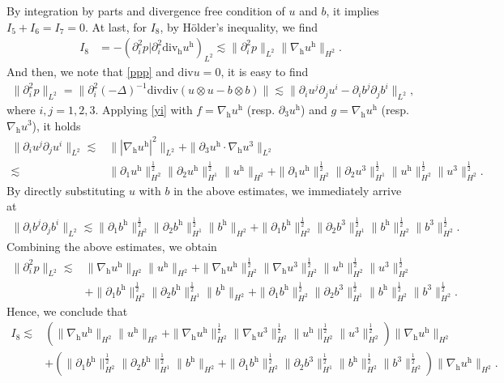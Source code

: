 \documentclass[11pt]{amsart}
\theoremstyle{definition}
\newcommand{\h}{\mathrm{h}}
\newcommand{\nablah}{\nabla_{\mathrm{h}}}
\numberwithin{equation}{section}
\begin{document}
By integration by parts and divergence free condition of $u$ and $b$, it implies $I_{5}+I_{6}=I_{7}=0$. At last, for $I_{8}$, by H\"older's inequality, we find
\begin{align*}
	I_{8}&=-
	\left(\partial_{i}^2p|\partial_{i}^2\mathrm{div}_\h u^\h\right)_{L^2}\lesssim\|\partial_{i}^2p\|_{L^2}\|\nabla_{\mathrm{h}}u^\mathrm{h}\|_{H^{2}}.
\end{align*}
And then, we note that \eqref{ppp}
and  $\mathrm{div}u=0$, it is easy to find
\begin{align*}
	\|\partial_{i}^2p\|_{L^2}=\|\partial_{i}^2(-\Delta)^{-1}\mathrm{divdiv}(u\otimes u-b\otimes b)\|\lesssim\|\partial_iu^j\partial_ju^i-\partial_ib^j\partial_jb^i\|_{L^2},
\end{align*}
where $i,j=1,2,3$. Applying \eqref{yi} with $f=\nablah u^\h$ (resp. $\partial_3 u^\h$) and $g=\nablah u^\h$ (resp. $\nablah u^3$), it holds
\begin{align*}
	\|\partial_iu^j\partial_ju^i\|_{L^2}\lesssim&\||\nablah u^\h|^2\|_{L^2}+\|\partial_3u^\h\cdot\nablah u^3\|_{L^2}\\
	\lesssim&\|\partial_1u^\h\|_{H^2}^\frac12\|\partial_2u^\h\|_{H^1}^\frac12\|u^\h\|_{H^2}+\|\partial_1u^\h\|_{H^2}^\frac12\|\partial_2u^3\|_{H^1}^\frac12\|u^\h\|_{H^2}^\frac12\|u^3\|_{H^2}^\frac12.
\end{align*}
By directly substituting $u$ with $b$ in the above estimates, we immediately arrive at
\begin{align*}
	\|\partial_ib^j\partial_jb^i\|_{L^2}\lesssim\|\partial_1b^\h\|_{H^2}^\frac12\|\partial_2b^\h\|_{H^1}^\frac12\|b^\h\|_{H^2}+\|\partial_1b^\h\|_{H^2}^\frac12\|\partial_2b^3\|_{H^1}^\frac12\|b^\h\|_{H^2}^\frac12\|b^3\|_{H^2}^\frac12.
\end{align*}
Combining the above estimates, we obtain
\begin{align}\label{P_H2}
	\|\partial_{i}^2p\|_{L^2}\lesssim&\|\nablah u^\h\|_{H^2}\|u^\h\|_{H^2}+ \|\nablah u^\h\|_{H^2}^\frac12\|\nablah u^3\|_{H^2}^\frac12\|u^\h\|_{H^2}^\frac12\|u^3\|_{H^2}^\frac12 \nonumber\\
	&+\|\partial_1b^\h\|_{H^2}^\frac12\|\partial_2b^\h\|_{H^1}^\frac12\|b^\h\|_{H^2}+\|\partial_1b^\h\|_{H^2}^\frac12\|\partial_2b^3\|_{H^1}^\frac12\|b^\h\|_{H^2}^\frac12\|b^3\|_{H^2}^\frac12.
\end{align}
Hence, we conclude that
\begin{align}\label{ii}
	I_8\lesssim&\left(\|\nablah u^\h\|_{H^2}\|u^\h\|_{H^2}+ \|\nablah u^\h\|_{H^2}^\frac12\|\nablah u^3\|_{H^2}^\frac12\|u^\h\|_{H^2}^\frac12\|u^3\|_{H^2}^\frac12 \right)\|\nablah u^\h\|_{H^{2}}\nonumber\\
	&+\left(\|\partial_1b^\h\|_{H^2}^\frac12\|\partial_2b^\h\|_{H^1}^\frac12\|b^\h\|_{H^2}+\|\partial_1b^\h\|_{H^2}^\frac12\|\partial_2b^3\|_{H^1}^\frac12\|b^\h\|_{H^2}^\frac12\|b^3\|_{H^2}^\frac12\right)\|\nablah u^\h\|_{H^{2}}.
\end{align}
\end{document}
